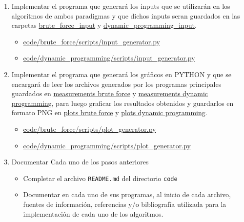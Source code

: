 \begin{enumerate}[(1)]
    \item Implementar el programa que generará los inputs que se utilizarán en los algoritmos de ambos paradigmas y que dichos inputs seran guardados en las carpetas \href{https://github.com/ianCooperA/INF221-2025-1-TAREA-2-3/tree/main/code/brute_force/data/brute_force_input}{brute\_force\_input} y \href{https://github.com/ianCooperA/INF221-2025-1-TAREA-2-3/blob/main/code/dynamic_programming/scripts/input_generator.py}{dynamic\_programming\_input}. 
    \begin{itemize}
        \item \href{https://github.com/ianCooperA/INF221-2025-1-TAREA-2-3/blob/main/code/brute_force/scripts/input_generator.py}{code/brute\_force/scripts/input\_generator.py}
        \item \href{https://github.com/ianCooperA/INF221-2025-1-TAREA-2-3/blob/main/code/dynamic_programming/scripts/input_generator.py}{code/dynamic\_programming/scripts/input\_generator.py}
    \end{itemize}
    
    \item Implementar el programa que generará los gráficos en PYTHON y que se encargará de leer los archivos generados por los programas principales guardados en  \href{https://github.com/ianCooperA/INF221-2025-1-TAREA-2-3/tree/main/code/brute_force/data/measurements/}{measurements brute force} y \href{https://github.com/ianCooperA/INF221-2025-1-TAREA-2-3/tree/main/code/dynamic_programming/data/measurements}{measurements dynamic programming}, para luego graficar los resultados obtenidos y guardarlos en formato PNG en  \href{https://github.com/ianCooperA/INF221-2025-1-TAREA-2-3/tree/main/code/brute_force/data/plots}{plots brute force} y \href{https://github.com/ianCooperA/INF221-2025-1-TAREA-2-3/tree/main/code/dynamic_programming/data/plots}{plots dynamic programming}.
    \begin{itemize}
        \item \href{https://github.com/ianCooperA/INF221-2025-1-TAREA-2-3/blob/main/code/brute_force/scripts/plot_generator.py}{code/brute\_force/scripts/plot\_generator.py}
        \item \href{https://github.com/ianCooperA/INF221-2025-1-TAREA-2-3/blob/main/code/dynamic_programming/scripts/plot_generator.py}{code/dynamic\_programming/scripts/plot\_generator.py}
    \end{itemize}
    \item Documentar Cada uno de los pasos anteriores
    \begin{itemize}
        \item Completar el archivo \texttt{README.md} del directorio \texttt{code}
        \item Documentar en cada uno de sus programas, al inicio de cada archivo, fuentes de información, referencias y/o bibliografía utilizada para la implementación de cada uno de los algoritmos.
    \end{itemize}
\end{enumerate}

